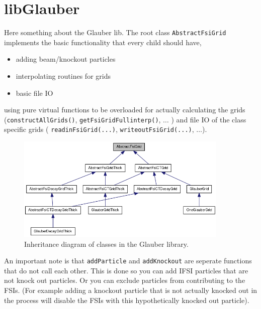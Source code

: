 \section{libGlauber}
Here something about the Glauber lib. The root class \texttt{AbstractFsiGrid} implements the basic functionality that every child should have,
\begin{itemize}
	\item adding beam/knockout particles 
	\item interpolating routines for grids
	\item basic file IO
\end{itemize}
using pure virtual functions to be overloaded for actually calculating the grids (\texttt{constructAllGrids()},
\texttt{getFsiGridFull\textunderscore interp()}, $\ldots$ ) and file IO of the class specific grids ( \texttt{readinFsiGrid(...)},
\texttt{writeoutFsiGrid(...)}, $\ldots$).
\begin{figure}
\centering
\includegraphics[width=0.9\textwidth]{figs/classAbstractFsiGrid__inherit__graph.png}
\caption{Inheritance diagram of classes in the Glauber library. }
\label{fig:AbstractFsiGrid__inherit__graph}
\end{figure}

An important note is that \texttt{addParticle} and \texttt{addKnockout} are seperate functions that do not call each other. This is done so you can add IFSI particles that are not knock out particles. Or you can exclude particles from contributing to the FSIs. (For example adding a knockout particle that is not actually knocked out in the process will disable the FSIs with this hypothetically knocked out particle).
